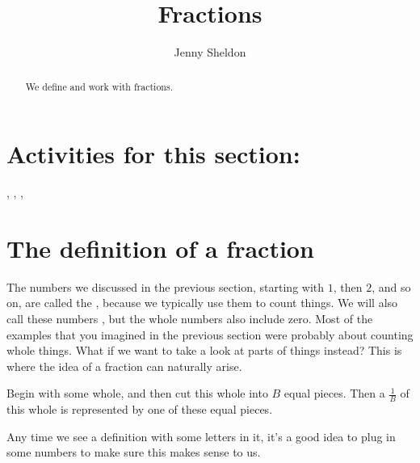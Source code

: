 \documentclass{ximera}
\title{Fractions}
\author{Jenny Sheldon}
\begin{document}
\begin{abstract}
We define and work with fractions.
\end{abstract}
\maketitle

\section{Activities for this section:} 
, 
, 
, 

\section{The definition of a fraction}

The numbers we discussed in the previous section, starting with $1$, then $2$, and so on, are called the , because we typically use them to count things. We will also call these numbers , but the whole numbers also include zero. Most of the examples that you imagined in the previous section were probably about counting whole things. What if we want to take a look at parts of things instead? This is where the idea of a fraction can naturally arise. 

\begin{definition}
Begin with some whole, and then cut this whole into $B$ equal pieces. Then a  $\frac{1}{B}$ of this whole is represented by one of these equal pieces.
\end{definition}
Any time we see a definition with some letters in it, it's a good idea to plug in some numbers to make sure this makes sense to us.
\end{document}
